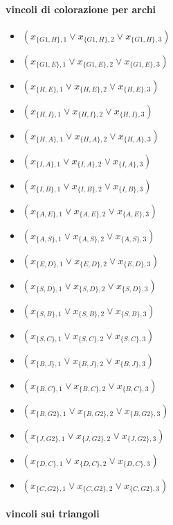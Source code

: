 \documentclass[10pt]{article}
\begin{document}
\paragraph{vincoli di colorazione per archi}
\begin{itemize}
    \item $(x_{\{G1, H\},1} \lor x_{\{G1, H\},2} \lor x_{\{G1, H\},3})$
    \item $(x_{\{G1, E\},1} \lor x_{\{G1, E\},2} \lor x_{\{G1, E\},3})$
    \item $(x_{\{H, E\},1} \lor x_{\{H, E\},2} \lor x_{\{H, E\},3})$
    \item $(x_{\{H, I\},1} \lor x_{\{H, I\},2} \lor x_{\{H, I\},3})$
    \item $(x_{\{H, A\},1} \lor x_{\{H, A\},2} \lor x_{\{H, A\},3})$
    \item $(x_{\{I, A\},1} \lor x_{\{I, A\},2} \lor x_{\{I, A\},3})$
    \item $(x_{\{I, B\},1} \lor x_{\{I, B\},2} \lor x_{\{I, B\},3})$
    \item $(x_{\{A, E\},1} \lor x_{\{A, E\},2} \lor x_{\{A, E\},3})$
    \item $(x_{\{A, S\},1} \lor x_{\{A, S\},2} \lor x_{\{A, S\},3})$
    \item $(x_{\{E, D\},1} \lor x_{\{E, D\},2} \lor x_{\{E, D\},3})$
    \item $(x_{\{S, D\},1} \lor x_{\{S, D\},2} \lor x_{\{S, D\},3})$
    \item $(x_{\{S, B\},1} \lor x_{\{S, B\},2} \lor x_{\{S, B\},3})$
    \item $(x_{\{S, C\},1} \lor x_{\{S, C\},2} \lor x_{\{S, C\},3})$
    \item $(x_{\{B, J\},1} \lor x_{\{B, J\},2} \lor x_{\{B, J\},3})$
    \item $(x_{\{B, C\},1} \lor x_{\{B, C\},2} \lor x_{\{B, C\},3})$
    \item $(x_{\{B, G2\},1} \lor x_{\{B, G2\},2} \lor x_{\{B, G2\},3})$
    \item $(x_{\{J, G2\},1} \lor x_{\{J, G2\},2} \lor x_{\{J, G2\},3})$
    \item $(x_{\{D, C\},1} \lor x_{\{D, C\},2} \lor x_{\{D, C\},3})$
    \item $(x_{\{C, G2\},1} \lor x_{\{C, G2\},2} \lor x_{\{C, G2\},3})$
\end{itemize}

\paragraph{vincoli sui triangoli}
\end{document}

